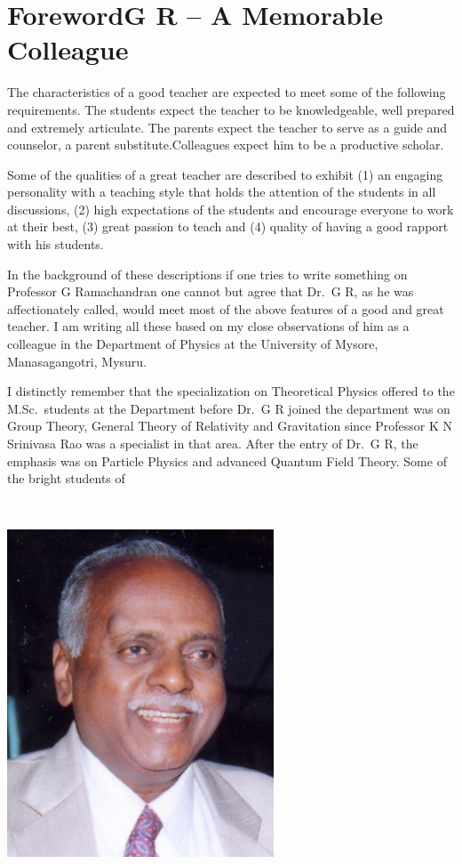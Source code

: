 \chapter*{Foreword\break G R – A Memorable Colleague}


The characteristics of a good teacher are expected to meet some of the following requirements. The students expect the teacher to be knowledgeable, well prepared and extremely articulate. The parents expect the teacher to serve as a guide and counselor, a parent substitute.\break Colleagues expect him to be a productive scholar.

Some of the qualities of a great teacher are described to exhibit (1) an engaging personality with a teaching style that holds the attention of the students in all discussions, (2) high expectations of the students and encourage everyone to work at their best, (3) great  passion to teach and  (4) quality of having a good rapport with his students.

In the background of these descriptions if one tries to write something on Professor G Ramachandran one cannot but agree that Dr.\ G R, as he was affectionately called, would meet most of the above features of a good and great teacher. I am writing all these based on my close observations of him as a colleague in the Department of Physics at the University of Mysore, Manasagangotri, Mysuru.

{\parfillskip=0pt
I distinctly remember that the specialization on Theoretical Physics offered to the M.Sc.\ students at the Department before Dr.\ G R joined the department was on Group Theory, General Theory of Relativity and Gravitation since Professor K N Srinivasa Rao was a specialist in that area. After the entry of Dr.\ G R, the emphasis was on Particle Physics and advanced Quantum Field Theory. Some of the bright students of\par}
\newpage
~
\vfill

\centerline{\includegraphics[scale=2]{authorsphotos/Prof_P_Venkataramaiah.jpg}}
\bigskip

